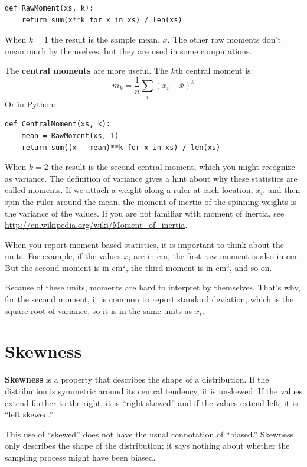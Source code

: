 \documentclass[12pt]{book}
\newcommand{\xbar}{\bar{x}}
\theoremstyle{exercise}
\begin{document}
\begin{verbatim}
def RawMoment(xs, k):
    return sum(x**k for x in xs) / len(xs)
\end{verbatim}

When $k=1$ the result is the sample mean, $\xbar$.  The other
raw moments don't mean much by themselves, but they are used
in some computations.

The {\bf central moments} are more useful.  The
$k$th central moment is:
%
\[ m_k = \frac{1}{n} \sum_i (x_i - \xbar)^k \]
%
Or in Python:

\begin{verbatim}
def CentralMoment(xs, k):
    mean = RawMoment(xs, 1)
    return sum((x - mean)**k for x in xs) / len(xs)
\end{verbatim}

When $k=2$ the result is the second central moment, which you might
recognize as variance.  The definition of variance gives a hint about
why these statistics are called moments.  If we attach a weight along a
ruler at each location, $x_i$, and then spin the ruler around
the mean, the moment of inertia of the spinning weights is the variance
of the values.  If you are not familiar with moment of inertia, see
\url{http://en.wikipedia.org/wiki/Moment_of_inertia}.%

When you report moment-based statistics, it is important to think
about the units.  For example, if the values $x_i$ are in cm, the
first raw moment is also in cm.  But the second moment is in
cm$^2$, the third moment is in cm$^3$, and so on.

Because of these units, moments are hard to interpret by themselves.
That's why, for the second moment, it is common to report standard
deviation, which is the square root of variance, so it is in the same
units as $x_i$.%


\section{Skewness}%

{\bf Skewness} is a property that describes the shape of a distribution.
If the distribution is symmetric around its central tendency, it is
unskewed.  If the values extend farther to the right, it is ``right
skewed'' and if the values extend left, it is ``left skewed.''%

This use of ``skewed'' does not have the usual connotation of
``biased.''  Skewness only describes the shape of the distribution;
it says nothing about whether the sampling process might have been
biased.%
%
\end{document}

